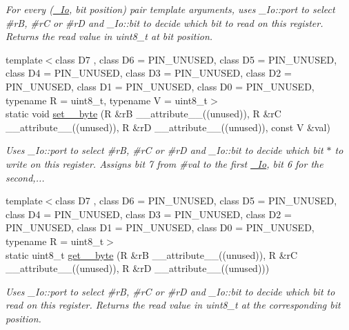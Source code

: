 \begin{DoxyCompactItemize}
\begin{DoxyCompactList}\small\item\em For every (\hyperlink{structports_1_1__Io}{\+\_\+\+Io}, \textquotesingle{}bit position\textquotesingle{}) pair template arguments, uses \+\_\+\+Io\+::port to select \#rB, \#rC or \#rD and \+\_\+\+Io\+::bit to decide which bit to read on this register. Returns the read value in uint8\+\_\+t at \textquotesingle{}bit position\textquotesingle{}. \end{DoxyCompactList}\item 
{\footnotesize template$<$class D7 , class D6  = P\+I\+N\+\_\+\+U\+N\+U\+S\+ED, class D5  = P\+I\+N\+\_\+\+U\+N\+U\+S\+ED, class D4  = P\+I\+N\+\_\+\+U\+N\+U\+S\+ED, class D3  = P\+I\+N\+\_\+\+U\+N\+U\+S\+ED, class D2  = P\+I\+N\+\_\+\+U\+N\+U\+S\+ED, class D1  = P\+I\+N\+\_\+\+U\+N\+U\+S\+ED, class D0  = P\+I\+N\+\_\+\+U\+N\+U\+S\+ED, typename R  = uint8\+\_\+t, typename V  = uint8\+\_\+t$>$ }\\static void \hyperlink{namespaceports_a19c06fd6aa6bf54de902e8ac44cc2e56}{set\+\_\+\_\+byte} (R \&rB \+\_\+\+\_\+attribute\+\_\+\+\_\+((unused)), R \&rC \+\_\+\+\_\+attribute\+\_\+\+\_\+((unused)), R \&rD \+\_\+\+\_\+attribute\+\_\+\+\_\+((unused)), const V \&val)
\begin{DoxyCompactList}\small\item\em Uses \+\_\+\+Io\+::port to select \#rB, \#rC or \#rD and \+\_\+\+Io\+::bit to decide which bit $\ast$ to write on this register. Assigns bit 7 from \#val to the first \hyperlink{structports_1_1__Io}{\+\_\+\+Io}, bit 6 for the second,... \end{DoxyCompactList}\item 
{\footnotesize template$<$class D7 , class D6  = P\+I\+N\+\_\+\+U\+N\+U\+S\+ED, class D5  = P\+I\+N\+\_\+\+U\+N\+U\+S\+ED, class D4  = P\+I\+N\+\_\+\+U\+N\+U\+S\+ED, class D3  = P\+I\+N\+\_\+\+U\+N\+U\+S\+ED, class D2  = P\+I\+N\+\_\+\+U\+N\+U\+S\+ED, class D1  = P\+I\+N\+\_\+\+U\+N\+U\+S\+ED, class D0  = P\+I\+N\+\_\+\+U\+N\+U\+S\+ED, typename R  = uint8\+\_\+t$>$ }\\static uint8\+\_\+t \hyperlink{namespaceports_a8c8245a3d0dc93b98260967a21c4db5b}{get\+\_\+\_\+byte} (R \&rB \+\_\+\+\_\+attribute\+\_\+\+\_\+((unused)), R \&rC \+\_\+\+\_\+attribute\+\_\+\+\_\+((unused)), R \&rD \+\_\+\+\_\+attribute\+\_\+\+\_\+((unused)))
\begin{DoxyCompactList}\small\item\em Uses \+\_\+\+Io\+::port to select \#rB, \#rC or \#rD and \+\_\+\+Io\+::bit to decide which bit to read on this register. Returns the read value in uint8\+\_\+t at the corresponding bit position. \end{DoxyCompactList}\item 

\end{DoxyCompactItemize}
